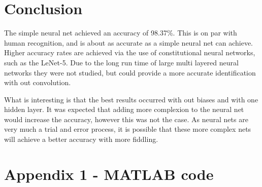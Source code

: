 \documentclass[12pt]{article}
\begin{document}
	
	
	
	
	


	
	\section{Conclusion}
	
	The simple neural net achieved an accuracy of 98.37\%. This is on par with human recognition, and is about as accurate as a simple neural net can achieve. Higher accuracy rates are achieved via the use of constitutional neural networks, such as the  LeNet-5\cite{len5en}. Due to the long run time of large multi layered neural networks they were not studied, but could provide a more accurate identification with out convolution.\par 
	
	What is interesting is that the best results occurred with out biases and with one hidden layer. It was expected that adding more complexion to the neural net would increase the accuracy, however this was not the case. As neural nets are very much a trial and error process, it is possible that these more complex nets will achieve a better accuracy with more fiddling. 

		
		
		

		
		\singlespacing
		\section*{Appendix 1 - MATLAB code}
		
\end{document}

